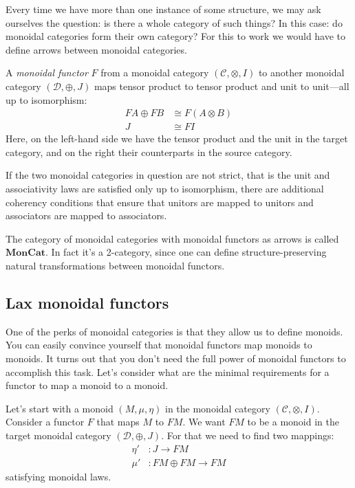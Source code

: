 \documentclass[DaoFP]{subfiles}
\begin{document}
Every time we have more than one instance of some structure, we may ask ourselves the question: is there a whole category of such things? In this case: do monoidal categories form their own category? For this to work we would have to define arrows between monoidal categories.

A \emph{monoidal functor} $F$ from a monoidal category $(\mathcal{C}, \otimes, I)$ to another monoidal category $(\mathcal{D}, \oplus, J)$ maps tensor product to tensor product and unit to unit---all up to isomorphism:
\begin{align*}
F A \oplus F B &\cong F (A \otimes B) \\
J &\cong F I 
\end{align*}
Here, on the left-hand side we have the tensor product and the unit in the target category, and on the right their counterparts in the source category. 

If the two monoidal categories in question are not strict, that is the unit and associativity laws are satisfied only up to isomorphism, there are additional coherency conditions that ensure that unitors are mapped to unitors and associators are mapped to associators.

The category of monoidal categories with monoidal functors as arrows is called $\mathbf{MonCat}$. In fact it's a 2-category, since one can define structure-preserving natural transformations between monoidal functors.

\subsection{Lax monoidal functors}

One of the perks of monoidal categories is that they allow us to define monoids. You can easily convince yourself that monoidal functors map monoids to monoids. It turns out that you don't need the full power of monoidal functors to accomplish this task. Let's consider what are the minimal requirements for a functor to map a monoid to a monoid. 

Let's start with a monoid $(M, \mu, \eta)$ in the monoidal category $(\mathcal{C}, \otimes, I)$. Consider a functor $F$ that maps $M$ to $F M$. We want $F M$ to be a monoid in the target monoidal category $(\mathcal{D}, \oplus, J)$. For that we need to find two mappings:
\begin{align*}
\eta' &\colon J \to F M \\
 \mu' &\colon F M \oplus F M \to F M 
\end{align*}
satisfying monoidal laws.
\end{document}

